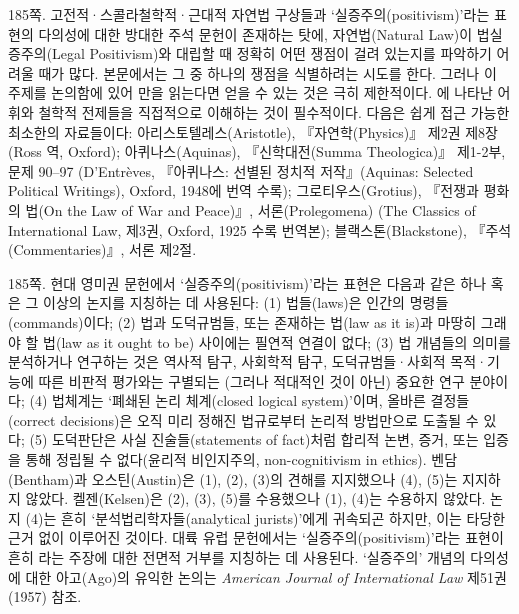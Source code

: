 {\footnotesize
\noteentry 185쪽.  고전적·스콜라철학적·근대적 자연법
구상들과 ‘실증주의(positivism)’라는 표현의 다의성에 대한 방대한 주석
문헌이 존재하는 탓에, 자연법(Natural Law)이 법실증주의(Legal
Positivism)와 대립할 때 정확히 어떤 쟁점이 걸려 있는지를 파악하기 어려울
때가 많다. 본문에서는 그 중 하나의 쟁점을 식별하려는 시도를 한다. 그러나
이 주제를 논의함에 있어 만을 읽는다면 얻을 수 있는 것은
극히 제한적이다. 에 나타난 어휘와 철학적
전제들을 직접적으로 이해하는 것이 필수적이다. 다음은 쉽게 접근 가능한
최소한의 자료들이다: 아리스토텔레스(Aristotle), 『자연학(Physics)』
제2권 제8장 (Ross 역, Oxford); 아퀴나스(Aquinas), 『신학대전(Summa
Theologica)』 제1-2부, 문제 90--97 (D'Entrèves, 『아퀴나스: 선별된
정치적 저작』(Aquinas: Selected Political Writings), Oxford, 1948에 번역
수록); 그로티우스(Grotius), 『전쟁과 평화의 법(On the Law of War and
Peace)』, 서론(Prolegomena) (The Classics of International Law, 제3권,
Oxford, 1925 수록 번역본); 블랙스톤(Blackstone), 『주석(Commentaries)』,
서론 제2절.

\noteentry 185쪽.  현대 영미권 문헌에서
‘실증주의(positivism)’라는 표현은 다음과 같은 하나 혹은 그 이상의 논지를
지칭하는 데 사용된다: (1) 법들(laws)은 인간의 명령들(commands)이다; (2)
법과 도덕규범들, 또는 존재하는 법(law as it is)과 마땅히 그래야 할
법(law as it ought to be) 사이에는 필연적 연결이 없다; (3) 법 개념들의
의미를 분석하거나 연구하는 것은 역사적 탐구, 사회학적 탐구,
도덕규범들·사회적 목적·기능에 따른 비판적 평가와는 구별되는 (그러나
적대적인 것이 아닌) 중요한 연구 분야이다; (4) 법체계는 ‘폐쇄된 논리
체계(closed logical system)’이며, 올바른 결정들(correct decisions)은
오직 미리 정해진 법규로부터 논리적 방법만으로 도출될 수 있다; (5)
도덕판단은 사실 진술들(statements of fact)처럼 합리적 논변, 증거, 또는
입증을 통해 정립될 수 없다(윤리적 비인지주의, non-cognitivism in
ethics). 벤담(Bentham)과 오스틴(Austin)은 (1), (2), (3)의 견해를
지지했으나 (4), (5)는 지지하지 않았다. 켈젠(Kelsen)은 (2), (3), (5)를
수용했으나 (1), (4)는 수용하지 않았다. 논지 (4)는 흔히
‘분석법리학자들(analytical jurists)’에게 귀속되곤 하지만, 이는 타당한
근거 없이 이루어진 것이다. 대륙 유럽 문헌에서는
‘실증주의(positivism)’라는 표현이 흔히 라는 주장에 대한 전면적 거부를
지칭하는 데 사용된다. ‘실증주의’ 개념의 다의성에 대한 아고(Ago)의 유익한
논의는 \emph{American Journal of International Law} 제51권(1957) 참조.

}

